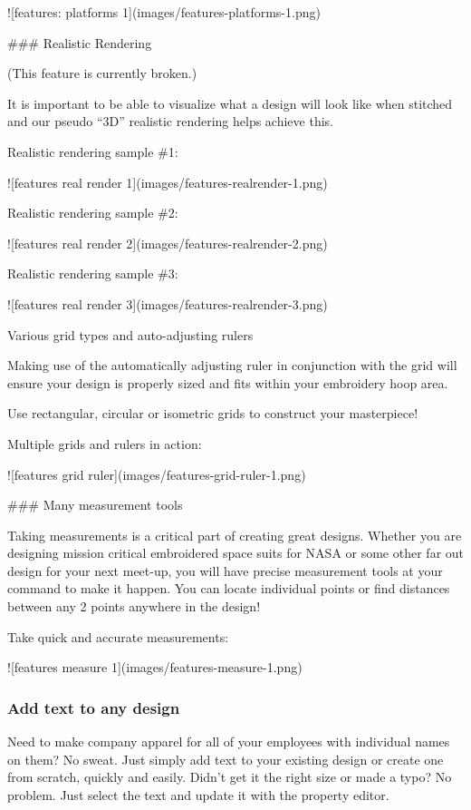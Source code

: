 ![features: platforms 1](images/features-platforms-1.png)

### Realistic Rendering

(This feature is currently broken.)

It is important to be able to visualize what a design will look like when stitched and our
pseudo ``3D'' realistic rendering helps achieve this.

Realistic rendering sample \#1:

![features real render 1](images/features-realrender-1.png)

Realistic rendering sample \#2:

![features real render 2](images/features-realrender-2.png)

Realistic rendering sample \#3:

![features real render 3](images/features-realrender-3.png)

Various grid types and auto-adjusting rulers

Making use of the automatically adjusting ruler in conjunction with the grid will ensure your
design is properly sized and fits within your embroidery hoop area.

Use rectangular, circular or isometric grids to construct your masterpiece!

Multiple grids and rulers in action:

![features grid ruler](images/features-grid-ruler-1.png)

### Many measurement tools

Taking measurements is a critical part of creating great designs. Whether you are designing
mission critical embroidered space suits for NASA or some other far out design for your next
meet-up, you will have precise measurement tools at your command to make it happen. You can
locate individual points or find distances between any 2 points anywhere in the design!

Take quick and accurate measurements:

![features measure 1](images/features-measure-1.png)

\subsubsection{Add text to any design}

Need to make company apparel for all of your employees with individual names on them? No sweat.
Just simply add text to your existing design or create one from scratch, quickly and easily.
Didn't get it the right size or made a typo? No problem. Just select the text and update it
with the property editor.

